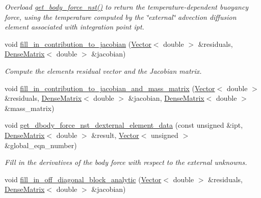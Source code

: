 \begin{DoxyCompactItemize}
\begin{DoxyCompactList}\small\item\em Overload \hyperlink{classoomph_1_1RefineableNavierStokesBoussinesqElement_a7c422f8666f9acef4d26f187a4dc4e28}{get\+\_\+body\+\_\+force\+\_\+nst()} to return the temperature-\/dependent buoyancy force, using the temperature computed by the \char`\"{}external\char`\"{} advection diffusion element associated with integration point {\ttfamily ipt}. \end{DoxyCompactList}\item 
void \hyperlink{classoomph_1_1RefineableNavierStokesBoussinesqElement_aab6bae7d0704ab7e3e121ee594ac887a}{fill\+\_\+in\+\_\+contribution\+\_\+to\+\_\+jacobian} (\hyperlink{classoomph_1_1Vector}{Vector}$<$ double $>$ \&residuals, \hyperlink{classoomph_1_1DenseMatrix}{Dense\+Matrix}$<$ double $>$ \&jacobian)
\begin{DoxyCompactList}\small\item\em Compute the element\textquotesingle{}s residual vector and the Jacobian matrix. \end{DoxyCompactList}\item 
void \hyperlink{classoomph_1_1RefineableNavierStokesBoussinesqElement_a02e9c7f347aa1c6defbcb20049fc8985}{fill\+\_\+in\+\_\+contribution\+\_\+to\+\_\+jacobian\+\_\+and\+\_\+mass\+\_\+matrix} (\hyperlink{classoomph_1_1Vector}{Vector}$<$ double $>$ \&residuals, \hyperlink{classoomph_1_1DenseMatrix}{Dense\+Matrix}$<$ double $>$ \&jacobian, \hyperlink{classoomph_1_1DenseMatrix}{Dense\+Matrix}$<$ double $>$ \&mass\+\_\+matrix)
\item 
void \hyperlink{classoomph_1_1RefineableNavierStokesBoussinesqElement_a4450f88be1c003160b9fa99df70a923b}{get\+\_\+dbody\+\_\+force\+\_\+nst\+\_\+dexternal\+\_\+element\+\_\+data} (const unsigned \&ipt, \hyperlink{classoomph_1_1DenseMatrix}{Dense\+Matrix}$<$ double $>$ \&result, \hyperlink{classoomph_1_1Vector}{Vector}$<$ unsigned $>$ \&global\+\_\+eqn\+\_\+number)
\begin{DoxyCompactList}\small\item\em Fill in the derivatives of the body force with respect to the external unknowns. \end{DoxyCompactList}\item 
void \hyperlink{classoomph_1_1RefineableNavierStokesBoussinesqElement_a9609dc454ef3d29b1e256fa32fb2c665}{fill\+\_\+in\+\_\+off\+\_\+diagonal\+\_\+block\+\_\+analytic} (\hyperlink{classoomph_1_1Vector}{Vector}$<$ double $>$ \&residuals, \hyperlink{classoomph_1_1DenseMatrix}{Dense\+Matrix}$<$ double $>$ \&jacobian)

\end{DoxyCompactItemize}
